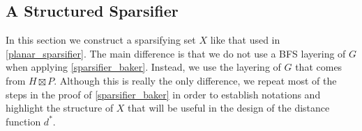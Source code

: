 \documentclass{patmorin}
\renewcommand{\le}{\leqslant}
\newcommand{\pat}[1]{\textcolor{Blue}{Pat: #1}}
\DeclareMathOperator{\tw}{tw}
\begin{document}
\subsection{A Structured Sparsifier}
\label{x_definition}

In this section we construct a sparsifying set $X$ like that used in \cref{planar_sparsifier}.  The main difference is that we do not use a BFS layering of $G$ when applying \cref{sparsifier_baker}. Instead, we use the layering of $G$ that comes from $H\boxtimes P$.  Although this is really the only difference, we repeat most of the steps in the proof of \cref{sparsifier_baker} in order to establish notations and highlight the structure of $X$ that will be useful in the design of the distance function $d^*$.

%
%
\end{document}
